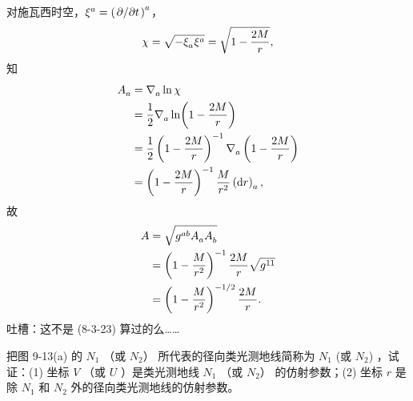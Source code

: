 \begin{xiti}
	\begin{jie}
		对施瓦西时空，$\tensor{\xi}{^a} = \tensor{\left( \pdv*{t} \right)}{^a}$，
		\begin{equation*}
			\chi = \sqrt{- \tensor{\xi}{_a} \tensor{\xi}{^a}} = \sqrt{1 - \frac{2M}{r}},
		\end{equation*}
		知
		\begin{align*}
			\tensor{A}{_a} &= \Nabla{a} \ln{\chi}\\
			&= \frac{1}{2} \Nabla{a} \ln(1 - \frac{2M}{r})\\
			&= \frac{1}{2} \left( 1 - \frac{2M}{r} \right)^{-1} \Nabla{a} \left( 1 - \frac{2M}{r} \right)\\
			&= \left( 1 - \frac{2M}{r} \right)^{-1} \frac{M}{r^2} \tensor{\left( \dd{r} \right)}{_a},
		\end{align*}
		故
		\begin{align*}
			A &= \sqrt{\tensor{g}{^a^b} \tensor{A}{_a} \tensor{A}{_b}}\\
			&= \left( 1 - \frac{M}{r^2} \right)^{-1} \frac{2M}{r} \sqrt{\tensor{g}{^1^1}}\\
			&= \left( 1 - \frac{M}{r^2} \right)^{-1/2} \frac{2M}{r}.
		\end{align*}
		吐槽：这不是 (8-3-23) 算过的么……
	\end{jie}

	\item 把图 9-13(a) 的 $N_1$ （或 $N_2$） 所代表的径向类光测地线简称为 $N_1$ (或 $N_2$) ，试证：(1) 坐标 $V$ （或 $U$ ）是类光测地线 $N_1$ （或 $N_2$） 的仿射参数；(2) 坐标 $r$ 是除 $N_1$ 和 $N_2$ 外的径向类光测地线的仿射参数。


\end{xiti}
